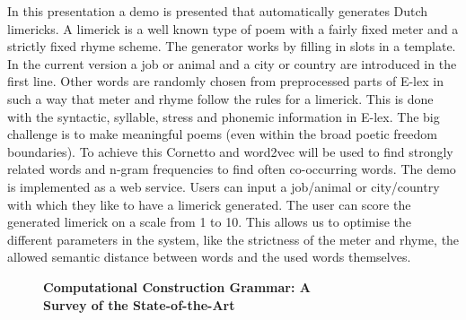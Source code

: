 \documentclass[10pt, a4paper, twopage, headinclude, footinclude, BCOR5mm]{scrartcl}
\begin{document}
\noindent
In this presentation a demo is presented that automatically generates Dutch limericks. A limerick is a well known type of poem with a fairly fixed meter and a strictly fixed rhyme scheme. The generator works by filling in slots in a template. In the current version a job or animal and a city or country are introduced in the first line. Other words are randomly chosen from preprocessed parts of E-lex in such a way that meter and rhyme follow the rules for a limerick. This is done with the syntactic, syllable, stress and phonemic information in E-lex. The big challenge is to make meaningful poems (even within the broad poetic freedom boundaries). To achieve this Cornetto and word2vec will be used to find strongly related words and n-gram frequencies to find often co-occurring words.  The demo is implemented as a web service. Users can input a job/animal or city/country with which they like to have a limerick generated. The user can score the generated limerick on a scale from 1 to 10. This allows us to optimise the different parameters in the system, like the strictness of the meter and rhyme, the allowed semantic distance between words and the used words themselves. 


\newpage

\begin{figure}[t!]
\centering
\large\textbf{Computational Construction Grammar: A \\ Survey of the State-of-the-Art}
\vspace*{0.5cm}
\end{figure}


        \begin{table}[t!]
    \end{table}
\end{document}
